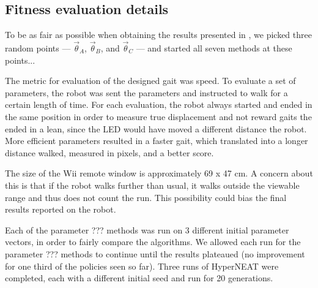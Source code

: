 \subsection{Fitness evaluation details}


To be as fair as possible when obtaining the results presented in
, we picked three random points --- $\vec{\theta}_A$,
$\vec{\theta}_B$, and $\vec{\theta}_C$ --- and started all seven
methods at these points...



The metric for evaluation of the designed gait was speed. To evaluate
a set of parameters, the robot was sent the parameters and instructed
to walk for a certain length of time. For each evaluation, the robot
always started and ended in the same position in order to measure true
displacement and not reward gaits the ended in a lean, since the LED
would have moved a different distance the robot. More efficient
parameters resulted in a faster gait, which translated into a longer
distance walked, measured in pixels, and a better score.

The size of the Wii remote window is approximately 69 x 47 cm. A
concern about this is that if the robot walks further than usual,
it walks outside the viewable range and thus does not count the run.
This possibility could bias the final results reported on the robot.

Each of the parameter ??? methods was run on 3 different initial
parameter vectors, in order to fairly compare the algorithms. We allowed 
each run for the parameter ??? methods to
continue until the results plateaued (no improvement for one third of
the policies seen so far). Three runs of HyperNEAT were completed,
each with a different initial seed and run for 20 generations.
